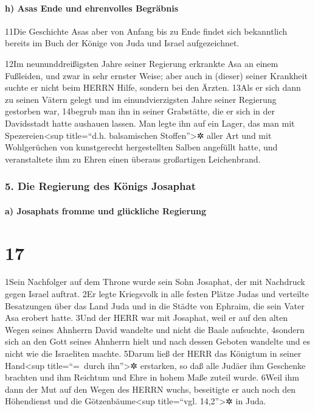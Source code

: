 \hypertarget{h-asas-ende-und-ehrenvolles-begruxe4bnis}{%
\paragraph{h) Asas Ende und ehrenvolles
Begräbnis}\label{h-asas-ende-und-ehrenvolles-begruxe4bnis}}

11Die Geschichte Asas aber von Anfang bis zu Ende findet sich
bekanntlich bereits im Buch der Könige von Juda und Israel
aufgezeichnet.

12Im neununddreißigsten Jahre seiner Regierung erkrankte Asa an einem
Fußleiden, und zwar in sehr ernster Weise; aber auch in (dieser) seiner
Krankheit suchte er nicht beim HERRN Hilfe, sondern bei den Ärzten.
13Als er sich dann zu seinen Vätern gelegt und im einundvierzigsten
Jahre seiner Regierung gestorben war, 14begrub man ihn in seiner
Grabstätte, die er sich in der Davidsstadt hatte aushauen lassen. Man
legte ihn auf ein Lager, das man mit Spezereien\textless sup
title=``d.h. balsamischen Stoffen''\textgreater✲ aller Art und mit
Wohlgerüchen von kunstgerecht hergestellten Salben angefüllt hatte, und
veranstaltete ihm zu Ehren einen überaus großartigen Leichenbrand.

\hypertarget{die-regierung-des-kuxf6nigs-josaphat}{%
\subsubsection{5. Die Regierung des Königs
Josaphat}\label{die-regierung-des-kuxf6nigs-josaphat}}

\hypertarget{a-josaphats-fromme-und-gluxfcckliche-regierung}{%
\paragraph{a) Josaphats fromme und glückliche
Regierung}\label{a-josaphats-fromme-und-gluxfcckliche-regierung}}

\hypertarget{section-16}{%
\section{17}\label{section-16}}

1Sein Nachfolger auf dem Throne wurde sein Sohn Josaphat, der mit
Nachdruck gegen Israel auftrat. 2Er legte Kriegsvolk in alle festen
Plätze Judas und verteilte Besatzungen über das Land Juda und in die
Städte von Ephraim, die sein Vater Asa erobert hatte. 3Und der HERR war
mit Josaphat, weil er auf den alten Wegen seines Ahnherrn David wandelte
und nicht die Baale aufsuchte, 4sondern sich an den Gott seines Ahnherrn
hielt und nach dessen Geboten wandelte und es nicht wie die Israeliten
machte. 5Darum ließ der HERR das Königtum in seiner Hand\textless sup
title=``=~durch ihn''\textgreater✲ erstarken, so daß alle Judäer ihm
Geschenke brachten und ihm Reichtum und Ehre in hohem Maße zuteil wurde.
6Weil ihm dann der Mut auf den Wegen des HERRN wuchs, beseitigte er auch
noch den Höhendienst und die Götzenbäume\textless sup title=``vgl.
14,2''\textgreater✲ in Juda.

